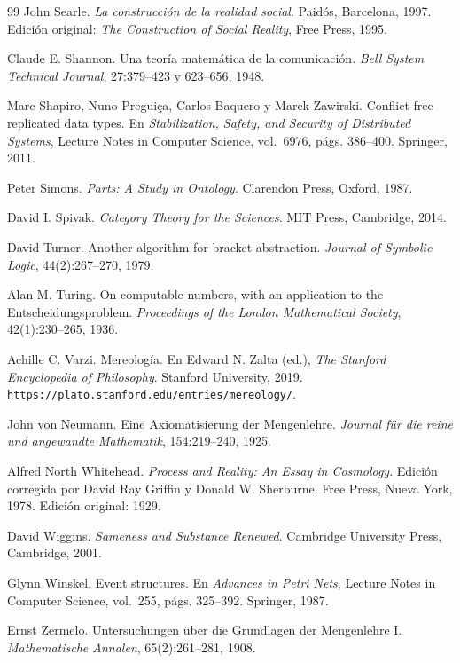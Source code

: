 \documentclass[12pt]{article}
\theoremstyle{plain}
\theoremstyle{definition}
\begin{document}
\begin{thebibliography}{99}
John Searle.
\textit{La construcción de la realidad social}.
Paidós, Barcelona, 1997.
Edición original: \textit{The Construction of Social Reality}, Free Press, 1995.

Claude E. Shannon.
Una teoría matemática de la comunicación.
\textit{Bell System Technical Journal}, 27:379--423 y 623--656, 1948.

Marc Shapiro, Nuno Preguiça, Carlos Baquero y Marek Zawirski.
Conflict-free replicated data types.
En \textit{Stabilization, Safety, and Security of Distributed Systems}, Lecture Notes in Computer Science, vol.~6976, págs. 386--400.
Springer, 2011.

Peter Simons.
\textit{Parts: A Study in Ontology}.
Clarendon Press, Oxford, 1987.

David I. Spivak.
\textit{Category Theory for the Sciences}.
MIT Press, Cambridge, 2014.

David Turner.
Another algorithm for bracket abstraction.
\textit{Journal of Symbolic Logic}, 44(2):267--270, 1979.

Alan M. Turing.
On computable numbers, with an application to the Entscheidungsproblem.
\textit{Proceedings of the London Mathematical Society}, 42(1):230--265, 1936.

Achille C. Varzi.
Mereología.
En Edward N. Zalta (ed.), \textit{The Stanford Encyclopedia of Philosophy}.
Stanford University, 2019.
\texttt{https://plato.stanford.edu/entries/mereology/}.

John von Neumann.
Eine Axiomatisierung der Mengenlehre.
\textit{Journal für die reine und angewandte Mathematik}, 154:219--240, 1925.

Alfred North Whitehead.
\textit{Process and Reality: An Essay in Cosmology}.
Edición corregida por David Ray Griffin y Donald W. Sherburne.
Free Press, Nueva York, 1978.
Edición original: 1929.

David Wiggins.
\textit{Sameness and Substance Renewed}.
Cambridge University Press, Cambridge, 2001.

Glynn Winskel.
Event structures.
En \textit{Advances in Petri Nets}, Lecture Notes in Computer Science, vol.~255, págs. 325--392.
Springer, 1987.

Ernst Zermelo.
Untersuchungen über die Grundlagen der Mengenlehre I.
\textit{Mathematische Annalen}, 65(2):261--281, 1908.

\end{thebibliography}
\end{document}
